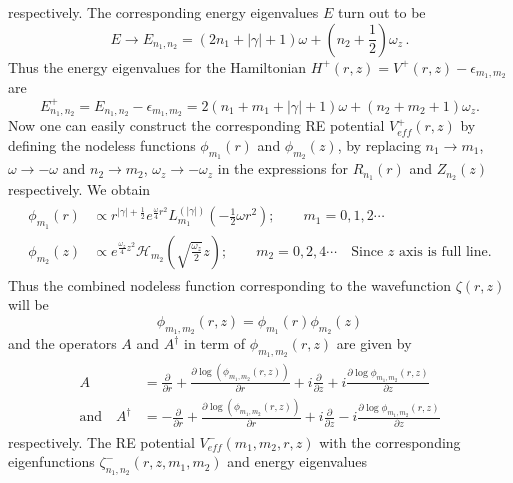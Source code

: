 \documentclass[12pt]{article}
\numberwithin{equation}{section} %
\begin{document}
respectively. The corresponding energy eigenvalues $E$ turn out to be
\begin{equation}
  E\rightarrow E_{n_1,n_2}=(2n_1+|\gamma|+1)\omega+\left(n_2+\frac{1}{2}\right)
\omega_z\,.
\end{equation}
Thus the energy eigenvalues for the Hamiltonian 
$H^+(r,z)=V^+(r,z)-\epsilon_{m_1,m_2}$ are
\begin{equation}\label{CYL:E+}
 E^+_{n_1,n_2}=E_{n_1,n_2}-\epsilon_{m_1,m_2}=2(n_1+m_1+|\gamma|+1)\omega
+(n_2+m_2+1)\omega_z.
\end{equation}
Now one can easily construct the corresponding RE potential $V_{eff}^+(r,z)$ 
by defining the nodeless functions $\phi_{m_1}(r)$ and $\phi_{m_2}(z)$, by 
replacing $n_1\rightarrow m_1$, $\omega\rightarrow-\omega$  and 
$n_2\rightarrow m_2$, $\omega_z\rightarrow-\omega_z$ in the expressions for 
$R_{n_1}(r)$ and $Z_{n_2}(z)$ respectively. We obtain 
\begin{align}
\begin{split}
    \phi_{m_1}(r)&\propto r^{|\gamma| +\frac{1}{2}} e^{\frac{\omega}{4}r^2} L_{m_1}^{(|\gamma|) }\left(-\frac{1}{2}\omega  r^2\right);\qquad m_1=0,1,2\cdots\\
    \phi_{m_2}(z)&\propto e^{\frac{\omega_z}{4} z^2} \mathcal{H}_{m_2}\left(\sqrt{\frac{\omega_z}{2} } z\right);\qquad m_2=0,2,4\cdots\quad\text{Since $z$ axis is full line.}
\end{split}
\end{align}
Thus the combined nodeless function corresponding to the wavefunction 
$\zeta(r,z)$ will be 
\begin{equation}
\phi_{m_1,m_2}(r,z)=\phi_{m_1}(r)\phi_{m_2}(z)
\end{equation} 
and the operators $A$ and $A^{\dagger}$ in term of $\phi_{m_1,m_2}(r,z)$ are given by
\begin{align}
	\begin{split}
		A&=\frac{\partial}{\partial r}+\frac{\partial \log(\phi_{m_1,m_2}(r,z))}{\partial r}+i\frac{\partial}{\partial z}+i \frac{\partial\log\phi_{m_1,m_2}(r,z)}{\partial z}\\
	\mbox{and} \quad	A^{\dagger}&=-\frac{\partial}{\partial r}+\frac{\partial \log(\phi_{m_1,m_2}(r,z))}{\partial r}+i\frac{\partial}{\partial z}-i \frac{\partial\log\phi_{m_1,m_2}(r,z)}{\partial z}
	\end{split}
\end{align}
respectively. The RE potential $V_{eff}^-(m_1,m_2,r,z)$ with the corresponding
eigenfunctions $\zeta_{n_1,n_2}^-(r,z,m_1,m_2)$ and energy eigenvalues 
\end{document}
